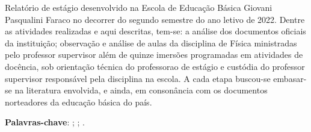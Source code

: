 \setlength{\absparsep}{18pt} %
\begin{resumo}
    Relatório de estágio desenvolvido na Escola de Educação Básica Giovani Pasqualini Faraco no decorrer do segundo semestre do ano letivo de 2022. Dentre as atividades realizadas e aqui descritas, tem-se: a análise dos documentos oficiais da instituição; observação e análise de aulas da disciplina de Física ministradas pelo professor supervisor além de quinze imersões programadas em atividades de docência, sob orientação técnica do professorao de estágio e custódia do professor supervisor responsável pela disciplina na escola. A cada etapa buscou-se embasar-se na literatura envolvida, e ainda, em consonância com os documentos norteadores da educação básica do país.

\textbf{Palavras-chave}: \firstkey ; \secondkey ; \thirdkey.
\end{resumo}
